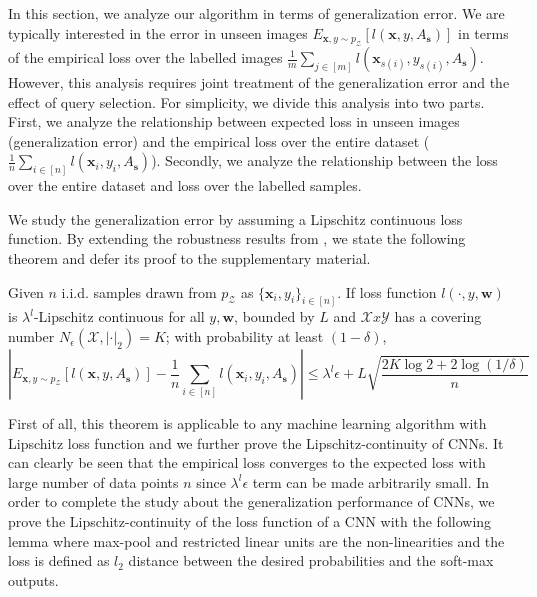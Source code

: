 In this section, we analyze our algorithm in terms of generalization error.  We are typically interested in the error in unseen images $E_{\mathbf{x},y \sim p_\mathcal{Z}}[l(\mathbf{x},y,A_{\mathbf{s}})]$ in terms of the empirical loss over the labelled images $\frac{1}{m}\sum_{j\in[m]} l(\mathbf{x}_{s(i)},y_{s(i)},A_{\mathbf{s}})$. However, this analysis requires joint treatment of the generalization error and the effect of query selection. For simplicity, we divide this analysis into two parts. First, we analyze the relationship between expected loss in unseen images (generalization error) and the empirical loss over the entire dataset ($\frac{1}{n}\sum_{i\in [n]} l(\mathbf{x}_i,y_i,A_\mathbf{s})$). Secondly, we analyze the relationship between the loss over the entire dataset and loss over the labelled samples. %

We study the generalization error by assuming a Lipschitz continuous loss function. By extending the robustness results from \cite{robust}, we state the following theorem and defer its proof to the supplementary material.
\begin{theorem}
Given $n$ i.i.d. samples drawn from $p_\mathcal{Z}$ as $\{\mathbf{x}_i,y_i\}_{i\in[n]}$. If loss function $l(\cdot,y,\mathbf{w})$ is $\lambda^l$-Lipschitz continuous for all $y, \mathbf{w}$, bounded by $L$ and $\mathcal{X}x\mathcal{Y}$ has a covering number $N_{\epsilon}(\mathcal{X},|\cdot|_2)=K$; with probability at least $(1-\delta)$,
\[
\left|E_{\mathbf{x},y \sim p_\mathcal{Z}}[l(\mathbf{x},y, A_\mathbf{s})] - \frac{1}{n}\sum_{i\in[n]} l(\mathbf{x}_i,y_i,A_\mathbf{s})\right|  \leq  \lambda^l \epsilon + L \sqrt{\frac{2K\log 2 + 2\log (1/\delta)}{n}}
\]
\label{mainthm}
\end{theorem}

First of all, this theorem is applicable to any machine learning algorithm with Lipschitz loss function and we further prove the Lipschitz-continuity of CNNs. It can clearly be seen that the empirical loss converges to the expected loss with large number of data points $n$ since $\lambda^l\epsilon$ term can be made arbitrarily small. In order to complete the study about the generalization performance of CNNs, we prove the Lipschitz-continuity of the loss function of a CNN with the following lemma where max-pool and restricted linear units are the non-linearities and the loss is defined as $l_2$ distance between the desired probabilities and the soft-max outputs.

